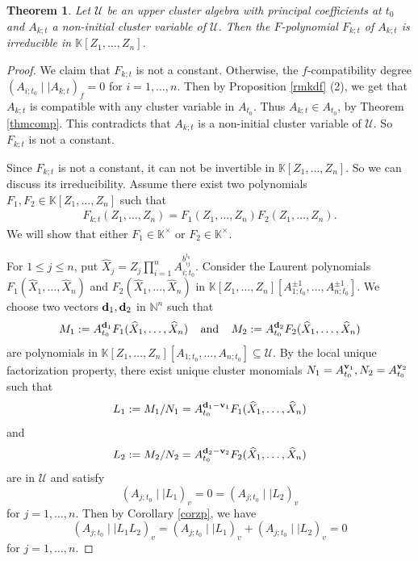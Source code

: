 \documentclass{amsart}
\newtheorem{theorem}{Theorem}[section]
\theoremstyle{definition}
\theoremstyle{remark}
\numberwithin{equation}{section}
\begin{document}
\begin{theorem}\label{thmffirr}
Let $\mathcal U$ be an upper cluster algebra with principal coefficients at $t_0$ and $A_{k;t}$ a non-initial cluster variable of $\mathcal U$.  Then the $F$-polynomial $F_{k;t}$ of $A_{k;t}$ is irreducible in $\mathbb K[Z_1,\ldots,Z_n]$.
\end{theorem}
\begin{proof} We claim that $F_{k;t}$ is not a constant. Otherwise,  the $f$-compatibility degree $(A_{i;t_0}\mid\mid A_{k;t})_f=0$ for $i=1,\ldots,n$. Then by Proposition \ref{rmkdf} (2), we get that $A_{k;t}$ is compatible with any cluster variable in $A_{t_0}$. Thus $A_{k;t}\in A_{t_0}$, by Theorem \ref{thmcomp}. This contradicts that $A_{k;t}$ is a non-initial cluster variable of $\mathcal U$. So $F_{k;t}$ is not a constant.


Since $F_{k;t}$ is not a constant, it can not be  invertible in  $\mathbb K[Z_1,\ldots,Z_n]$. So we can discuss its irreducibility. Assume there exist two polynomials $F_1,F_2\in \mathbb K[Z_1,\ldots,Z_n]$ such that
\begin{eqnarray}\label{eqnf}
F_{k;t}(Z_1,\ldots,Z_n)=F_1(Z_1,\ldots,Z_n)F_2(Z_1,\ldots,Z_n).
\end{eqnarray}
We will show that either $F_1\in\mathbb K^\times$ or $F_2\in\mathbb K^\times$.

For $1\leq j\leq n$, put $\widehat X_j=Z_j\prod\limits_{i=1}^nA_{i;t_0}^{b_{ij}^{t_0}}$.
Consider the Laurent polynomials
$F_1(\widehat X_1,\ldots,\widehat X_n)$ and $F_2(\widehat X_1,\ldots,\widehat X_n)$
in $\mathbb K[Z_1,\ldots,Z_n][A_{1;t_0}^{\pm1},\ldots,A_{n;t_0}^{\pm1}]$.
We choose two vectors ${\bf d}_1, {\bf d}_2$ in $\mathbb N^n$ such that
\[
M_1:=A_{t_0}^{{\bf d}_1}F_1(\widehat X_1,\ldots,\widehat X_n)\;\;\;\; \text{and}\;\;\; \;
M_2:=A_{t_0}^{{\bf d}_2}F_2(\widehat X_1,\ldots,\widehat X_n)
\]
are polynomials in
$\mathbb K[Z_1,\ldots,Z_n][A_{1;t_0},\ldots,A_{n;t_0}]\subseteq\mathcal U$. By the local unique factorization property, there exist unique
cluster monomials $N_1=A_{t_0}^{{\bf v}_1}, N_2=A_{t_0}^{{\bf v}_2}$ such that
$$L_1:=M_1/N_1=A_{t_0}^{{\bf d}_1-{\bf v}_1}F_1(\widehat X_1,\ldots,\widehat X_n)$$ and
$$L_2:=M_2/N_2=A_{t_0}^{{\bf d}_2-{\bf v}_2}F_2(\widehat X_1,\ldots,\widehat X_n)$$
are in $\mathcal U$ and satisfy $$(A_{j;t_0}\mid\mid L_1)_v=0=(A_{j;t_0}\mid\mid L_2)_v$$ for $j=1,\ldots,n$. Then by Corollary \ref{corzp}, we have $$(A_{j;t_0}\mid\mid L_1L_2)_v=(A_{j;t_0}\mid\mid L_1)_v+(A_{j;t_0}\mid\mid L_2)_v=0$$ for $j=1,\ldots,n$.



\end{proof}
\end{document}
